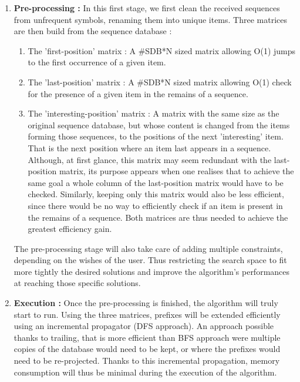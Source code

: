 \documentclass{eplmastersthesis}
\begin{document}
\begin{enumerate}
\item \textbf{Pre-processing :} In this first stage, we first clean the received sequences from unfrequent symbols, renaming them into unique items. Three matrices are then build from the sequence database :
	\begin{enumerate}
		\item The 'first-position' matrix : A \#SDB*N sized matrix allowing O(1) jumps to the first occurrence of a given item. 
		\item The 'last-position' matrix : A  \#SDB*N sized matrix allowing O(1) check for the presence of a given item in the remains of a sequence.
		\item The 'interesting-position' matrix : A matrix with the same size as the original sequence database, but whose content is changed from the items forming those sequences, to the positions of the next 'interesting' item. That is the next position where an item last appears in a sequence. \\ Although, at first glance, this matrix may seem redundant with the last-position matrix, its purpose appears when one realises that to achieve the same goal a whole column of the last-position matrix would have to be checked. Similarly, keeping only this matrix would also be less efficient, since there would be no way to efficiently check if an item is present in the remains of a sequence. Both matrices are thus needed to achieve the greatest efficiency gain. 
	\end{enumerate}
	
	The pre-processing stage will also take care of adding multiple constraints, depending on the wishes of the user. Thus restricting the search space to fit more tightly the desired solutions and improve the algorithm's performances at reaching those specific solutions.
	
\item \textbf{Execution :} Once the pre-processing is finished, the algorithm will truly start to run. Using the three matrices, prefixes will be extended efficiently using an incremental propagator (DFS approach). An approach possible thanks to trailing, that is more efficient than BFS approach were multiple copies of the database would need to be kept, or where the prefixes would need to be re-projected. Thanks to this incremental propagation, memory consumption will thus be minimal during the execution of the algorithm. \newline


\end{enumerate}
\end{document}
